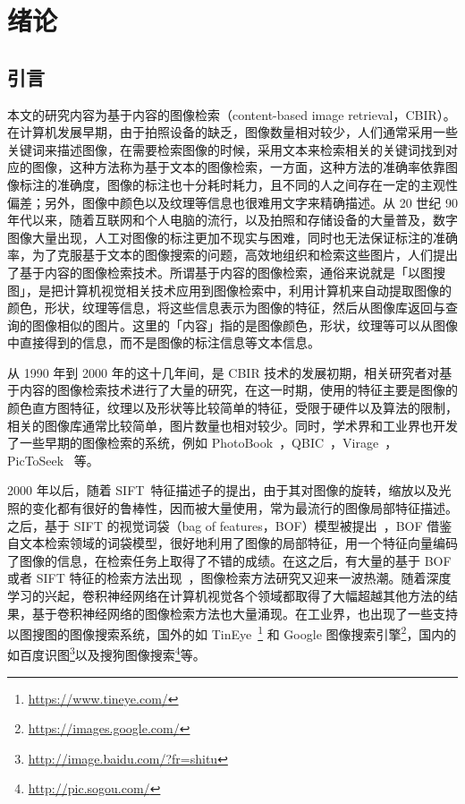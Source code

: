 
\chapter{绪论}
\label{Chapter_introduction}

\section{引言}
本文的研究内容为基于内容的图像检索（content-based image retrieval，CBIR）。在计算机发展早期，由于拍照设备的缺乏，图像数量相对较少，人们通常采用一些关键词来描述图像，在需要检索图像的时候，采用文本来检索相关的关键词找到对应的图像，这种方法称为基于文本的图像检索，一方面，这种方法的准确率依靠图像标注的准确度，图像的标注也十分耗时耗力，且不同的人之间存在一定的主观性偏差；另外，图像中颜色以及纹理等信息也很难用文字来精确描述。从 20 世纪 90 年代以来，随着互联网和个人电脑的流行，以及拍照和存储设备的大量普及，数字图像大量出现，人工对图像的标注更加不现实与困难，同时也无法保证标注的准确率，为了克服基于文本的图像搜索的问题，高效地组织和检索这些图片，人们提出了基于内容的图像检索技术。所谓基于内容的图像检索，通俗来说就是「以图搜图」，是把计算机视觉相关技术应用到图像检索中，利用计算机来自动提取图像的颜色，形状，纹理等信息，将这些信息表示为图像的特征，然后从图像库返回与查询的图像相似的图片。这里的「内容」指的是图像颜色，形状，纹理等可以从图像中直接得到的信息，而不是图像的标注信息等文本信息。

从 1990 年到 2000 年的这十几年间，是 CBIR 技术的发展初期，相关研究者对基于内容的图像检索技术进行了大量的研究，在这一时期，使用的特征主要是图像的颜色直方图特征，纹理以及形状等比较简单的特征，受限于硬件以及算法的限制，相关的图像库通常比较简单，图片数量也相对较少。同时，学术界和工业界也开发了一些早期的图像检索的系统，例如 PhotoBook~\cite{Pentland1996PhotobookCM}，QBIC~\cite{Niblack1993TheQP}，Virage~\cite{Bach1996VirageIS}，PicToSeek~\cite{Gevers2000PicToSeekCC} 等。

2000 年以后，随着 SIFT~\cite{Lowe2004DistinctiveIF}特征描述子的提出，由于其对图像的旋转，缩放以及光照的变化都有很好的鲁棒性，因而被大量使用，常为最流行的图像局部特征描述。之后，基于 SIFT 的视觉词袋（bag of features，BOF）模型被提出~\cite{Sivic2003VideoGA}，BOF 借鉴自文本检索领域的词袋模型，很好地利用了图像的局部特征，用一个特征向量编码了图像的信息，在检索任务上取得了不错的成绩。在这之后，有大量的基于 BOF 或者 SIFT 特征的检索方法出现~\cite{Philbin2008LostIQ,Philbin2007ObjectRW,Mikulk2010LearningAF,Arandjelovic2012ThreeTE,Chum2007TotalRA}，图像检索方法研究又迎来一波热潮。随着深度学习的兴起，卷积神经网络在计算机视觉各个领域都取得了大幅超越其他方法的结果，基于卷积神经网络的图像检索方法也大量涌现。在工业界，也出现了一些支持以图搜图的图像搜索系统，国外的如 TinEye~\footnote{\url{https://www.tineye.com/}} 和 Google 图像搜索引擎\footnote{\url{https://images.google.com/}}，国内的如百度识图\footnote{\url{http://image.baidu.com/?fr=shitu}}以及搜狗图像搜索\footnote{\url{http://pic.sogou.com/}}等。

